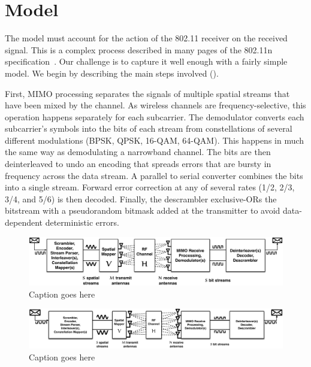 \ifx\mainfile\undefined

\setcounter{chapter}{3} %
\fi

\cleardoublepage
\chapter{Model}
\label{chap:model}

The model must account for the action of the 802.11 receiver on the received signal. This is a complex process described in many pages of the 802.11n specification~\cite{80211n}. Our challenge is to capture it well enough with a fairly simple model. We begin by describing the main steps involved ().

First, MIMO processing separates the signals of multiple spatial streams that have been mixed by the channel. As wireless channels are frequency-selective, this operation happens separately for each subcarrier. The demodulator converts each subcarrier's symbols into the bits of each stream from constellations of several different modulations (BPSK, QPSK, 16-QAM, 64-QAM). This happens in much the same way as demodulating a narrowband channel. The bits are then deinterleaved to undo an encoding that spreads errors that are bursty in frequency across the data stream. A parallel to serial converter combines the bits into a single stream. Forward error correction at any of several rates (1/2, 2/3, 3/4, and 5/6) is then decoded. Finally, the descrambler exclusive-ORs the bitstream with a pseudorandom bitmask added at the transmitter to avoid data-dependent deterministic errors.

\begin{figure}[ht]
\centering
\includegraphics[width=\textwidth]{figures/11n_link_simplified_bigger_fonts.pdf}
\caption[An 802.11n link]{Caption goes here}
\end{figure}

\begin{figure}[ht]
\centering
\includegraphics[angle=90,height=\textheight]{figures/11n_link_simplified.pdf}
\caption[An 802.11n link]{Caption goes here}
\end{figure}

